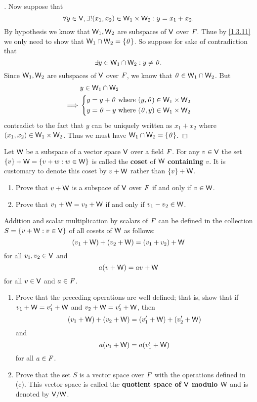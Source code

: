 \begin{proof}[]
  Now suppose that
  \[
    \forall y \in \mathsf{V}, \exists! (x_1, x_2) \in \mathsf{W}_1 \times \mathsf{W}_2 : y = x_1 + x_2.
  \]
  By hypothesis we know that \(\mathsf{W}_1, \mathsf{W}_2\) are subspaces of \(\mathsf{V}\) over \(\mathit{F}\).
  Thue by \cref{1.3.11} we only need to show that \(\mathsf{W}_1 \cap \mathsf{W}_2 = \left\lbrace\mathit{0}\right\rbrace\).
  So suppose for sake of contradiction that
  \[
    \exists y \in \mathsf{W}_1 \cap \mathsf{W}_2 : y \neq \mathit{0}.
  \]
  Since \(\mathsf{W}_1, \mathsf{W}_2\) are subspaces of \(\mathsf{V}\) over \(\mathit{F}\), we know that \(\mathit{0} \in \mathsf{W}_1 \cap \mathsf{W}_2\).
  But
  \begin{align*}
             & y \in \mathsf{W}_1 \cap \mathsf{W}_2        \\
    \implies & \begin{dcases}
      y = y + \mathit{0} \text{ where } (y, \mathit{0}) \in \mathsf{W}_1 \times \mathsf{W}_2 \\
      y = \mathit{0} + y \text{ where } (\mathit{0}, y) \in \mathsf{W}_1 \times \mathsf{W}_2
    \end{dcases}
  \end{align*}
  contradict to the fact that \(y\) can be uniquely written as \(x_1 + x_2\) where \((x_1, x_2) \in \mathsf{W}_1 \times \mathsf{W}_2\).
  Thus we must have \(\mathsf{W}_1 \cap \mathsf{W}_2 = \left\lbrace\mathit{0}\right\rbrace\).
\end{proof}

\begin{ex}\label{ex:1.3.31}
  Let \(\mathsf{W}\) be a subspace of a vector space \(\mathsf{V}\) over a field \(\mathit{F}\).
  For any \(v \in \mathsf{V}\) the set \(\left\lbrace v\right\rbrace + \mathsf{W} = \left\lbrace v + w : w \in \mathsf{W}\right\rbrace\) is called the \textbf{coset} of \(\mathsf{W}\) \textbf{containing} \(v\).
  It is customary to denote this coset by \(v + \mathsf{W}\) rather than \(\left\lbrace v\right\rbrace + \mathsf{W}\).
  \begin{enumerate}
    \item Prove that \(v + \mathsf{W}\) is a subspace of \(\mathsf{V}\) over \(\mathit{F}\) if and only if \(v \in \mathsf{W}\).
    \item Prove that \(v_1 + \mathsf{W} = v_2 + \mathsf{W}\) if and only if \(v_1 - v_2 \in \mathsf{W}\).
  \end{enumerate}
  Addition and scalar multiplication by scalars of \(\mathit{F}\) can be defined in the collection \(S = \left\lbrace v + \mathsf{W} : v \in \mathsf{V}\right\rbrace\) of all cosets of \(\mathsf{W}\) as follows:
  \[
    (v_1 + \mathsf{W}) + (v_2 + \mathsf{W}) = (v_1 + v_2) + \mathsf{W}
  \]
  for all \(v_1, v_2 \in \mathsf{V}\) and
  \[
    a(v + \mathsf{W}) = av + \mathsf{W}
  \]
  for all \(v \in \mathsf{V}\) and \(a \in \mathit{F}\).
  \begin{enumerate}[resume]
    \item Prove that the preceding operations are well defined;
          that is, show that if \(v_1 + \mathsf{W} = v_1' + \mathsf{W}\) and \(v_2 + \mathsf{W} = v_2' + \mathsf{W}\), then
          \[
            (v_1 + \mathsf{W}) + (v_2 + \mathsf{W}) = (v_1' + \mathsf{W}) + (v_2' + \mathsf{W})
          \]
          and
          \[
            a(v_1 + \mathsf{W}) = a(v_1' + \mathsf{W})
          \]
          for all \(a \in \mathit{F}\).
    \item Prove that the set \(S\) is a vector space over \(\mathit{F}\) with the operations defined in (c).
          This vector space is called the \textbf{quotient space of \(\mathsf{V}\) modulo \(\mathsf{W}\)} and is denoted by \(\mathsf{V} / \mathsf{W}\).
  \end{enumerate}
\end{ex}

